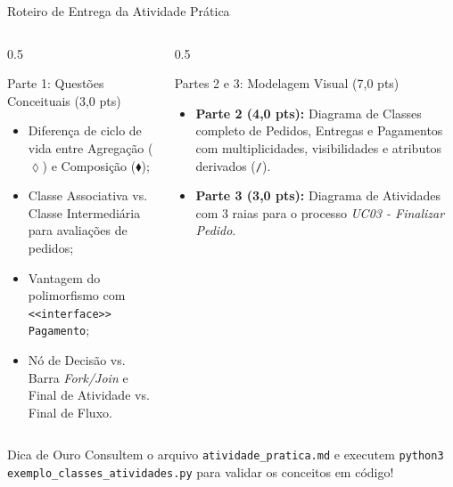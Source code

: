 \documentclass[10pt]{beamer}
\begin{document}
\begin{frame}{Roteiro de Entrega da Atividade Prática}
    \begin{columns}
        \begin{column}{0.5\textwidth}
            \begin{block}{Parte 1: Questões Conceituais (3,0 pts)}
                \footnotesize
                \begin{itemize}
                    \item Diferença de ciclo de vida entre Agregação ($\lozenge$) e Composição ($\blacklozenge$);
                    \item Classe Associativa vs. Classe Intermediária para avaliações de pedidos;
                    \item Vantagem do polimorfismo com \texttt{<<interface>> Pagamento};
                    \item Nó de Decisão vs. Barra \textit{Fork/Join} e Final de Atividade vs. Final de Fluxo.
                \end{itemize}
            \end{block}
        \end{column}
        \begin{column}{0.5\textwidth}
            \begin{exampleblock}{Partes 2 e 3: Modelagem Visual (7,0 pts)}
                \footnotesize
                \begin{itemize}
                    \item \textbf{Parte 2 (4,0 pts):} Diagrama de Classes completo de Pedidos, Entregas e Pagamentos com multiplicidades, visibilidades e atributos derivados (\texttt{/}).
                    \item \textbf{Parte 3 (3,0 pts):} Diagrama de Atividades com 3 raias para o processo \textit{UC03 - Finalizar Pedido}.
                \end{itemize}
            \end{exampleblock}
        \end{column}
    \end{columns}
    \vspace{0.2cm}
    \begin{alertblock}{Dica de Ouro}
        Consultem o arquivo \texttt{atividade\_pratica.md} e executem \texttt{python3 exemplo\_classes\_atividades.py} para validar os conceitos em código!
    \end{alertblock}
\end{frame}
\end{document}
